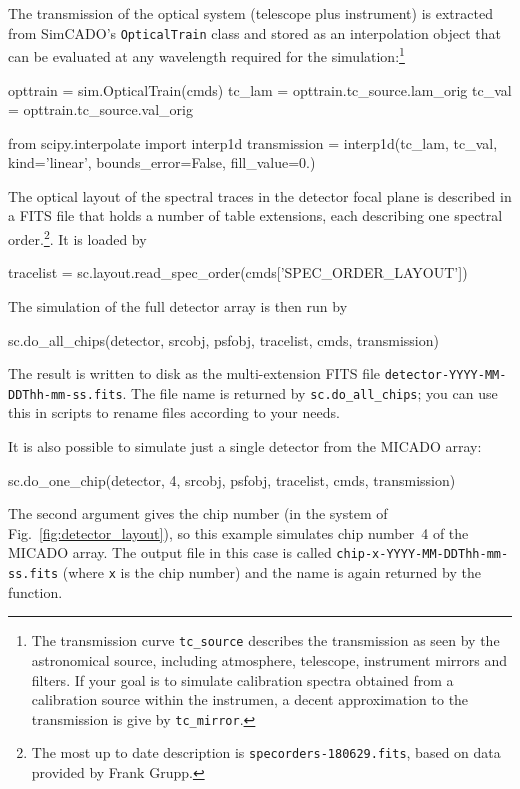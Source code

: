 \documentclass[a4paper,twoside,11pt]{article}
\begin{document}
The transmission of the optical system (telescope plus instrument) is
extracted from SimCADO's \lstinline{OpticalTrain} class and stored as
an interpolation object that can be evaluated at any wavelength
required for the simulation:\footnote{The transmission curve
  \lstinline{tc_source} describes the transmission as seen by the
  astronomical source, including atmosphere, telescope, instrument
  mirrors and filters. If your goal is to simulate calibration spectra
  obtained from a calibration source within the instrumen, a decent
  approximation to the transmission is give by \lstinline{tc_mirror}.}
\begin{pyin}
opttrain = sim.OpticalTrain(cmds)
tc_lam = opttrain.tc_source.lam_orig
tc_val = opttrain.tc_source.val_orig

from scipy.interpolate import interp1d
transmission = interp1d(tc_lam, tc_val, kind='linear',
                        bounds_error=False, fill_value=0.)
\end{pyin}

The optical layout of the spectral traces in the detector focal plane
is described in a FITS file that holds a number of table extensions,
each describing one spectral order.\footnote{The most up to date
  description is \lstinline{specorders-180629.fits}, based on data
  provided by Frank Grupp.}. It is loaded by
\begin{pyin}
tracelist = sc.layout.read_spec_order(cmds['SPEC_ORDER_LAYOUT'])
\end{pyin}

The simulation of the full detector array is then run by
\begin{pyin}
sc.do_all_chips(detector, srcobj, psfobj, tracelist, cmds,
                transmission)
\end{pyin}
The result is written to disk as the multi-extension FITS file
\lstinline{detector-YYYY-MM-DDThh-mm-ss.fits}. The file name is
returned by \lstinline{sc.do_all_chips}; you can use this in scripts
to rename files according to your needs.

It is also possible to simulate just a single detector from the MICADO
array:
\begin{pyin}
sc.do_one_chip(detector, 4, srcobj, psfobj, tracelist, cmds,
               transmission)
\end{pyin}
The second argument gives the chip number (in the system of
Fig.~\ref{fig:detector_layout}), so this example simulates chip
number~4 of the MICADO array. The output file in this case is called
\lstinline{chip-x-YYYY-MM-DDThh-mm-ss.fits} (where \lstinline{x} is
the chip number) and the name is again returned by the function.
\end{document}
